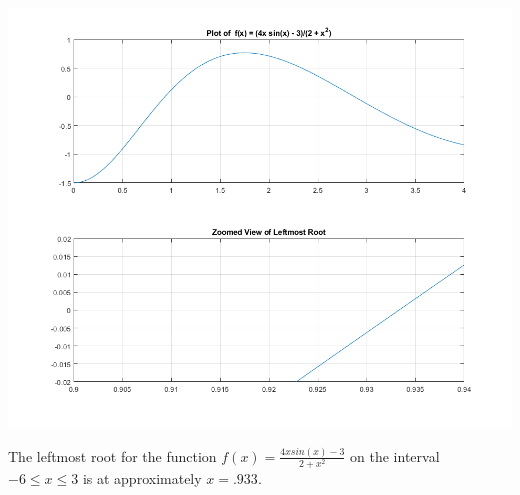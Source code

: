 \documentclass[12pt]{article}
\makeatletter
\theoremstyle{homework}
\newenvironment{exercise}[1]
{\def\@currentlabel{#1}\exercisecore}
{\endexercisecore}
\makeatother
\begin{document}
\begin{exercise}{5}
\begin{enumerate}
  
  \begin{center}
    \includegraphics[width=\textwidth]{plotfunction2.png}
  \end{center}
  
  The leftmost root for the function $f(x) = \frac{4x sin(x) - 3}{2 + x^2}$ on the interval $-6 \le x \le 3$ is at approximately $x = .933$.
  \end{enumerate}

\end{exercise}
\vspace{1in}
\end{document}
